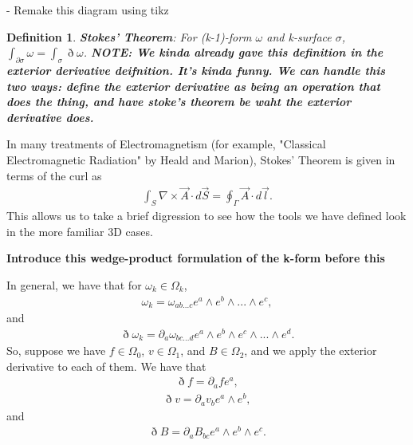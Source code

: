 \documentclass{book}
\newtheorem{defn}[equation]{Definition}
\begin{document}
- Remake this diagram using tikz



\begin{defn}
	\textbf{Stokes' Theorem}: For (k-1)-form $\omega$ and k-surface $\sigma$, $\int_{\partial \sigma}\omega = \int_{\sigma}\eth\omega$. \textbf{NOTE: We kinda already gave this definition in the exterior derivative deifnition. It's kinda funny. We can handle this two ways: define the exterior derivative as being an operation that does the thing, and have stoke's theorem be waht the exterior derivative does. }
\end{defn}

In many treatments of Electromagnetism (for example, "Classical Electromagnetic Radiation" by Heald and Marion), Stokes' Theorem is given in terms of the curl as \begin{gather}\int_S \nabla \times \vec{A} \cdot d\vec{S} = \oint_{\Gamma} \vec{A} \cdot d\vec{l}.\end{gather} This allows us to take a brief digression to see how the tools we have defined look in the more familiar 3D cases. 

\textbf{Introduce this wedge-product formulation of the k-form before this}

In general, we have that for $\omega_k \in \Omega_k$, \begin{gather}\omega_k = \omega_{ab...c}e^a\wedge e^b \wedge ... \wedge e^c,\end{gather} and \begin{gather} \eth \omega_k = \partial_a\omega_{bc...d}e^a\wedge e^b\wedge e^c\wedge ... \wedge e^d.\end{gather} So, suppose we have $f \in \Omega_0$, $v \in \Omega_1$, and $B \in \Omega_2$, and we apply the exterior derivative to each of them. We have that \begin{gather}\eth f = \partial_a f e^a,\end{gather} \begin{gather}\eth v = \partial_a v_b e^a \wedge e^b,\end{gather} and \begin{gather}\eth B = \partial_a B_{bc} e^a\wedge e^b \wedge e^c.\end{gather} 
\end{document}
